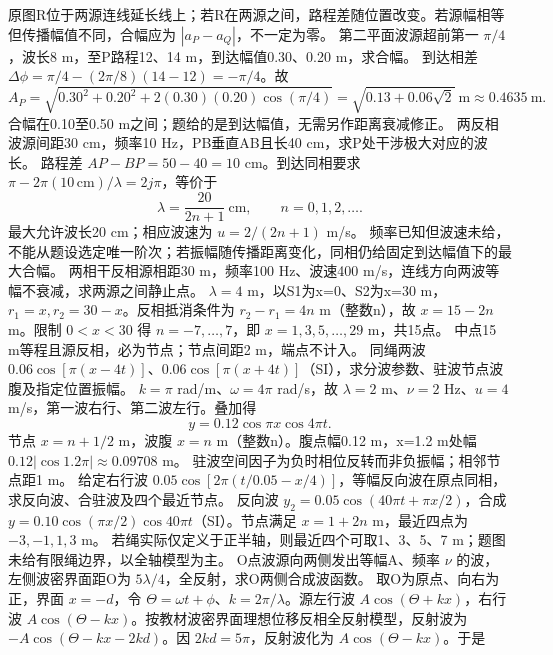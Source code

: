 \crosscheck 原图R位于两源连线延长线上；若R在两源之间，路程差随位置改变。若源幅相等但传播幅值不同，合幅应为 $|a_P-a_Q|$，不一定为零。
\problemtext 第二平面波源超前第一 $\pi/4$，波长8 m，至P路程12、14 m，到达幅值0.30、0.20 m，求合幅。
\workings 到达相差 $\Delta\phi=\pi/4-(2\pi/8)(14-12)=-\pi/4$。故
\[
A_P=\sqrt{0.30^2+0.20^2+2(0.30)(0.20)\cos(\pi/4)}
=\sqrt{0.13+0.06\sqrt2}\ \mathrm m
\approx0.4635\ \mathrm m .
\]
\crosscheck 合幅在0.10至0.50 m之间；题给的是到达幅值，无需另作距离衰减修正。
\problemtext 两反相波源间距30 cm，频率10 Hz，PB垂直AB且长40 cm，求P处干涉极大对应的波长。
\workings 路程差 $AP-BP=50-40=10$ cm。到达同相要求 $\pi-2\pi(10\,\mathrm{cm})/\lambda=2j\pi$，等价于
\[
\lambda=\frac{20}{2n+1}\ \mathrm{cm},\qquad n=0,1,2,\ldots .
\]
最大允许波长20 cm；相应波速为 $u=2/(2n+1)$ m/s。
\crosscheck 频率已知但波速未给，不能从题设选定唯一阶次；若振幅随传播距离变化，同相仍给固定到达幅值下的最大合幅。
\problemtext 两相干反相源相距30 m，频率100 Hz、波速400 m/s，连线方向两波等幅不衰减，求两源之间静止点。
\workings $\lambda=4$ m，以S1为x=0、S2为x=30 m，$r_1=x,r_2=30-x$。反相抵消条件为 $r_2-r_1=4n$ m（整数n），故 $x=15-2n$ m。限制 $0<x<30$ 得 $n=-7,\ldots,7$，即 $x=1,3,5,\ldots,29$ m，共15点。
\crosscheck 中点15 m等程且源反相，必为节点；节点间距2 m，端点不计入。
\problemtext 同绳两波 $0.06\cos[\pi(x-4t)]$、$0.06\cos[\pi(x+4t)]$（SI），求分波参数、驻波节点波腹及指定位置振幅。
\workings $k=\pi$ rad/m、$\omega=4\pi$ rad/s，故 $\lambda=2$ m、$\nu=2$ Hz、$u=4$ m/s，第一波右行、第二波左行。叠加得
\[
y=0.12\cos\pi x\cos4\pi t .
\]
节点 $x=n+1/2$ m，波腹 $x=n$ m（整数n）。腹点幅0.12 m，x=1.2 m处幅 $0.12|\cos1.2\pi|\approx0.09708$ m。
\crosscheck 驻波空间因子为负时相位反转而非负振幅；相邻节点距1 m。
\problemtext 给定右行波 $0.05\cos[2\pi(t/0.05-x/4)]$，等幅反向波在原点同相，求反向波、合驻波及四个最近节点。
\workings 反向波 $y_2=0.05\cos(40\pi t+\pi x/2)$，合成 $y=0.10\cos(\pi x/2)\cos40\pi t$（SI）。节点满足 $x=1+2n$ m，最近四点为 $-3,-1,1,3$ m。
\crosscheck 若绳实际仅定义于正半轴，则最近四个可取1、3、5、7 m；题图未给有限绳边界，以全轴模型为主。
\problemtext O点波源向两侧发出等幅A、频率 $\nu$ 的波，左侧波密界面距O为 $5\lambda/4$，全反射，求O两侧合成波函数。
\workings 取O为原点、向右为正，界面 $x=-d$，令 $\Theta=\omega t+\phi$、$k=2\pi/\lambda$。源左行波 $A\cos(\Theta+kx)$，右行波 $A\cos(\Theta-kx)$。按教材波密界面理想位移反相全反射模型，反射波为 $-A\cos(\Theta-kx-2kd)$。因 $2kd=5\pi$，反射波化为 $A\cos(\Theta-kx)$。于是
